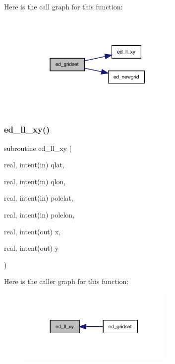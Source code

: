 Here is the call graph for this function\+:
\nopagebreak
\begin{figure}[H]
\begin{center}
\leavevmode
\includegraphics[width=223pt]{ed__grid_8f90_a634ac391a90a7bba5c99f2654da64652_cgraph}
\end{center}
\end{figure}
\mbox{\label{ed__grid_8f90_a1e00cf0eabe83f2cc3c5d9ab15c730fb}} 
\subsubsection{\texorpdfstring{ed\+\_\+ll\+\_\+xy()}{ed\_ll\_xy()}}
{\footnotesize\ttfamily subroutine ed\+\_\+ll\+\_\+xy (\begin{DoxyParamCaption}\item[{real, intent(in)}]{qlat,  }\item[{real, intent(in)}]{qlon,  }\item[{real, intent(in)}]{polelat,  }\item[{real, intent(in)}]{polelon,  }\item[{real, intent(out)}]{x,  }\item[{real, intent(out)}]{y }\end{DoxyParamCaption})}

Here is the caller graph for this function\+:
\nopagebreak
\begin{figure}[H]
\begin{center}
\leavevmode
\includegraphics[width=212pt]{ed__grid_8f90_a1e00cf0eabe83f2cc3c5d9ab15c730fb_icgraph}
\end{center}
\end{figure}
\mbox{\label{ed__grid_8f90_a91112e6806db1100d405228002308384}} 
